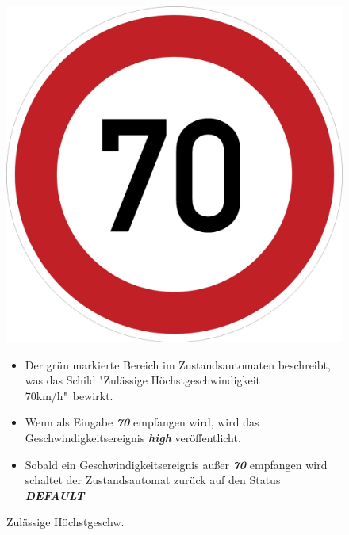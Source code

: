 \begin{figure}[h]
\begin{minipage}[t]{4cm}
\vspace{0pt}
\centering
\includegraphics[scale=0.06]{images/70.png}
\caption{Zul\"assige H\"ochstgeschw.}
\label{fig:PED}
\end{minipage}
\hfill
\begin{minipage}[t]{10cm}
\vspace{0pt}
\begin{itemize}
\item Der gr\"un markierte Bereich im Zustandsautomaten beschreibt, was das Schild "Zul\"assige H\"ochstgeschwindigkeit 70km/h"\ bewirkt.

\item Wenn als Eingabe \textbf{\textit{70}} empfangen wird, wird das Geschwindigkeitsereignis \textbf{\textit{high}} ver\"offentlicht.

\item Sobald ein Geschwindigkeitsereignis au\ss{}er \textbf{\textit{70}} empfangen wird schaltet der Zustandsautomat zur\"uck auf den Status \textbf{\textit{DEFAULT}}
\end{itemize}
\end{minipage}
\end{figure}
